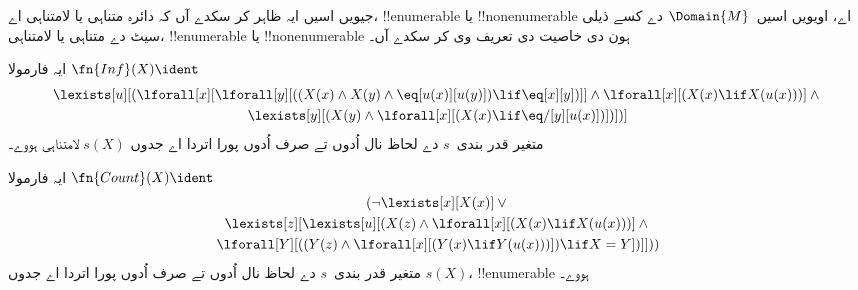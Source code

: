 \documentclass[../../../include/open-logic-section]{subfiles}
\begin{document}


\begin{explain}
جیویں اسیں ایہ ظاہر کر سکدے آں کہ دائرہ متناہی یا لامتناہی اے،
!!{enumerable} یا !!{nonenumerable} اے، اویویں اسیں~$\Domain{M}$ دے کسے
ذیلی سیٹ دے متناہی یا لامتناہی، !!{enumerable} یا !!{nonenumerable} ہون دی خاصیت
دی تعریف وی کر سکدے آں۔
\end{explain}

\begin{prop}
ایہ فارمولا $\fn{Inf}(X) \ident$
\begin{multline*}
\lexists[u][(\lforall[x][\lforall[y][((X(x) \land X(y) \land \eq[u(x)][u(y)]) \lif
      \eq[x][y])]] \land \lforall[x][(X(x) \lif X(u(x)))] \land {} \\\lexists[y][(X(y) \land \lforall[x][(X(x)
      \lif \eq/[y][u(x)])])])]
\end{multline*}
متغیر قدر بندی~$s$ دے لحاظ نال اُدوں تے صرف اُدوں پورا اتردا اے جدوں
$s(X)$ لامتناہی ہووے۔
\end{prop}

\begin{prop}
ایہ فارمولا $\fn{Count}(X) \ident $
\begin{multline*}
(\lnot\lexists[x][X(x)] \lor {} \\
\lexists[z][\lexists[u][(X(z) \land
    \lforall[x][(X(x) \lif X(u(x)))] \land {} \\ \lforall[Y][((Y(z) \land
      \lforall[x][(Y(x) \lif Y(u(x)))]) \lif X = Y])]])
)
\end{multline*}
متغیر قدر بندی~$s$ دے لحاظ نال اُدوں تے صرف اُدوں پورا اتردا اے جدوں
$s(X)$، !!{enumerable} ہووے۔
\end{prop}
\end{document}
